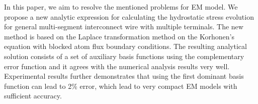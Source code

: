 




In this paper, we aim to resolve the mentioned problems for EM
model. We propose a new analytic expression for calculating the
hydrostatic stress evolution for general multi-segment interconnect
wire with multiple terminals. The new method is based on the Laplace
transformation method on the Korhonen's equation with blocked atom
flux boundary conditions. The resulting analytical solution consists
of a set of auxiliary basis functions using the complementary error
function and it agrees with the numerical analysis results very
well. Experimental results further demonstrates that using the first
dominant basis function can lead to 2\% error, which lead to very
compact EM models with sufficient accuracy.

